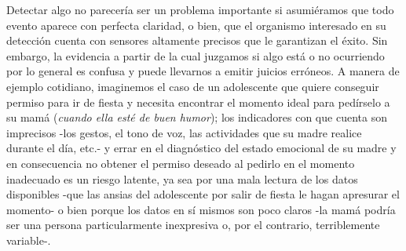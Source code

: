 Detectar algo no parecería ser un problema importante si asumiéramos que todo evento aparece con perfecta claridad, o bien, que el organismo interesado en su detección cuenta con sensores altamente precisos que le garantizan el éxito. Sin embargo, la evidencia a partir de la cual juzgamos si algo está o no ocurriendo por lo general es confusa y puede llevarnos a emitir juicios erróneos. A manera de ejemplo cotidiano, imaginemos el caso de un adolescente que quiere conseguir permiso para ir de fiesta y necesita encontrar el momento ideal para pedírselo a su mamá (\textit{cuando ella esté de buen humor}); los indicadores con que cuenta son imprecisos -los gestos, el tono de voz, las actividades que su madre realice durante el día, etc.- y errar en el diagnóstico del estado emocional de su madre y en consecuencia no obtener el permiso deseado al pedirlo en el momento inadecuado es un riesgo latente, ya sea por una mala lectura de los datos disponibles -que las ansias del adolescente por salir de fiesta le hagan apresurar el momento- o bien porque los datos en sí mismos son poco claros -la mamá podría ser una persona particularmente inexpresiva o, por el contrario, terriblemente variable-.\\ 


